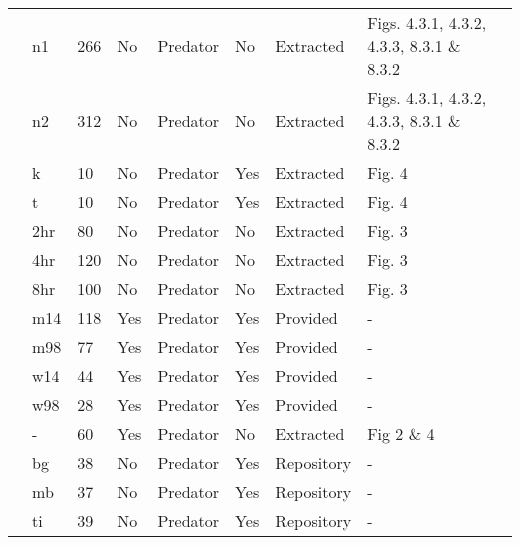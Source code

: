 \begin{longtable}{lllllllll}
\citet{Uttley:1980aa}&n1&266&No&Predator&No&Extracted&Figs. 4.3.1, 4.3.2, 4.3.3, 8.3.1 \& 8.3.2&\citet{Novak:2020aa}\tabularnewline
\citet{Uttley:1980aa}&n2&312&No&Predator&No&Extracted&Figs. 4.3.1, 4.3.2, 4.3.3, 8.3.1 \& 8.3.2&\citet{Novak:2020aa}\tabularnewline
\citet{Vahl:2005aa}&k&10&No&Predator&Yes&Extracted&Fig. 4&\citet{Novak:2020aa}\tabularnewline
\citet{Vahl:2005aa}&t&10&No&Predator&Yes&Extracted&Fig. 4&\citet{Novak:2020aa}\tabularnewline
\citet{Von-Westernhagen:1976aa}&2hr&80&No&Predator&No&Extracted&Fig. 3&\citet{Novak:2020aa}\tabularnewline
\citet{Von-Westernhagen:1976aa}&4hr&120&No&Predator&No&Extracted&Fig. 3&\citet{Novak:2020aa}\tabularnewline
\citet{Von-Westernhagen:1976aa}&8hr&100&No&Predator&No&Extracted&Fig. 3&\citet{Novak:2020aa}\tabularnewline
\citet{Vucetich:2002aa}&m14&118&Yes&Predator&Yes&Provided&-&\citet{Vucetich:2002aa, Jost:2005aa}\tabularnewline
\citet{Vucetich:2002aa}&m98&77&Yes&Predator&Yes&Provided&-&\citet{Vucetich:2002aa, Jost:2005aa}\tabularnewline
\citet{Vucetich:2002aa}&w14&44&Yes&Predator&Yes&Provided&-&\citet{Vucetich:2002aa, Jost:2005aa}\tabularnewline
\citet{Vucetich:2002aa}&w98&28&Yes&Predator&Yes&Provided&-&\citet{Vucetich:2002aa, Jost:2005aa}\tabularnewline
\citet{Walde:1984aa}&-&60&Yes&Predator&No&Extracted&Fig 2 \& 4&\citet{Novak:2020aa}\tabularnewline
\citet{Wasserman:2016aa}&bg&38&No&Predator&Yes&Repository&-&\citet{Wasserman:2016ab}\tabularnewline
\citet{Wasserman:2016aa}&mb&37&No&Predator&Yes&Repository&-&\citet{Wasserman:2016ab}\tabularnewline
\citet{Wasserman:2016aa}&ti&39&No&Predator&Yes&Repository&-&\citet{Wasserman:2016ab}\tabularnewline
\hline
\end{longtable}
